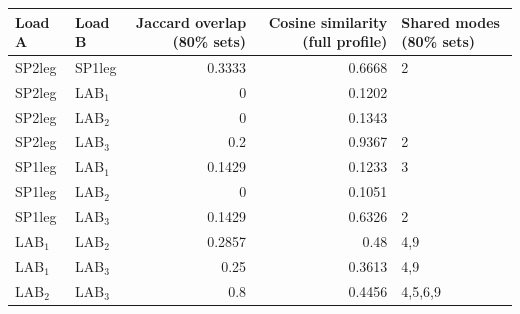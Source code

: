 \begin{tabular}{llrrl}
\toprule
Load A & Load B & Jaccard overlap (80\% sets) & Cosine similarity (full profile) & Shared modes (80\% sets) \\
\midrule
SP2leg & SP1leg & 0.3333 & 0.6668 & 2 \\
SP2leg & LAB$_1$ & 0 & 0.1202 &  \\
SP2leg & LAB$_2$ & 0 & 0.1343 &  \\
SP2leg & LAB$_3$ & 0.2 & 0.9367 & 2 \\
SP1leg & LAB$_1$ & 0.1429 & 0.1233 & 3 \\
SP1leg & LAB$_2$ & 0 & 0.1051 &  \\
SP1leg & LAB$_3$ & 0.1429 & 0.6326 & 2 \\
LAB$_1$ & LAB$_2$ & 0.2857 & 0.48 & 4,9 \\
LAB$_1$ & LAB$_3$ & 0.25 & 0.3613 & 4,9 \\
LAB$_2$ & LAB$_3$ & 0.8 & 0.4456 & 4,5,6,9 \\
\bottomrule
\end{tabular}
